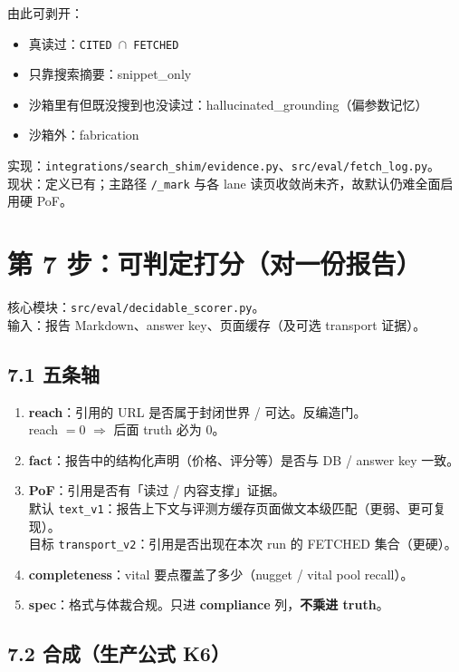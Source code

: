 \documentclass[11pt,a4paper]{article}
\begin{document}
由此可剥开：
\begin{itemize}[leftmargin=1.5em]
  \item 真读过：\texttt{CITED $\cap$ FETCHED}
  \item 只靠搜索摘要：snippet\_only
  \item 沙箱里有但既没搜到也没读过：hallucinated\_grounding（偏参数记忆）
  \item 沙箱外：fabrication
\end{itemize}

实现：\texttt{integrations/search\_shim/evidence.py}、\texttt{src/eval/fetch\_log.py}。\\
现状：定义已有；主路径 \texttt{/\_mark} 与各 lane 读页收敛尚未齐，故默认仍难全面启用硬 PoF。

\section{第 7 步：可判定打分（对一份报告）}

核心模块：\texttt{src/eval/decidable\_scorer.py}。\\
输入：报告 Markdown、answer key、页面缓存（及可选 transport 证据）。

\subsection{7.1 五条轴}

\begin{enumerate}[leftmargin=1.8em]
  \item \textbf{reach}：引用的 URL 是否属于封闭世界 / 可达。反编造门。\\
        reach $= 0$ $\Rightarrow$ 后面 truth 必为 0。
  \item \textbf{fact}：报告中的结构化声明（价格、评分等）是否与 DB / answer key 一致。
  \item \textbf{PoF}：引用是否有「读过 / 内容支撑」证据。\\
        默认 \texttt{text\_v1}：报告上下文与评测方缓存页面做文本级匹配（更弱、更可复现）。\\
        目标 \texttt{transport\_v2}：引用是否出现在本次 run 的 FETCHED 集合（更硬）。
  \item \textbf{completeness}：vital 要点覆盖了多少（nugget / vital pool recall）。
  \item \textbf{spec}：格式与体裁合规。只进 \textbf{compliance} 列，\textbf{不乘进 truth}。
\end{enumerate}

\subsection{7.2 合成（生产公式 K6）}
\end{document}
